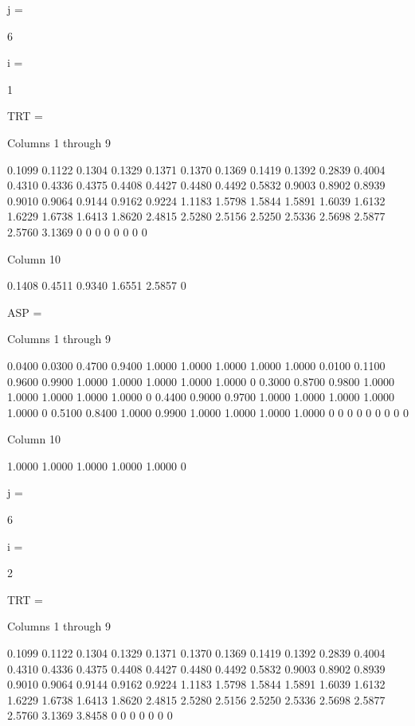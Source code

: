 j =

     6


i =

     1


TRT =

  Columns 1 through 9

    0.1099    0.1122    0.1304    0.1329    0.1371    0.1370    0.1369    0.1419    0.1392
    0.2839    0.4004    0.4310    0.4336    0.4375    0.4408    0.4427    0.4480    0.4492
    0.5832    0.9003    0.8902    0.8939    0.9010    0.9064    0.9144    0.9162    0.9224
    1.1183    1.5798    1.5844    1.5891    1.6039    1.6132    1.6229    1.6738    1.6413
    1.8620    2.4815    2.5280    2.5156    2.5250    2.5336    2.5698    2.5877    2.5760
    3.1369         0         0         0         0         0         0         0         0

  Column 10

    0.1408
    0.4511
    0.9340
    1.6551
    2.5857
         0


ASP =

  Columns 1 through 9

    0.0400    0.0300    0.4700    0.9400    1.0000    1.0000    1.0000    1.0000    1.0000
    0.0100    0.1100    0.9600    0.9900    1.0000    1.0000    1.0000    1.0000    1.0000
         0    0.3000    0.8700    0.9800    1.0000    1.0000    1.0000    1.0000    1.0000
         0    0.4400    0.9000    0.9700    1.0000    1.0000    1.0000    1.0000    1.0000
         0    0.5100    0.8400    1.0000    0.9900    1.0000    1.0000    1.0000    1.0000
         0         0         0         0         0         0         0         0         0

  Column 10

    1.0000
    1.0000
    1.0000
    1.0000
    1.0000
         0


j =

     6


i =

     2


TRT =

  Columns 1 through 9

    0.1099    0.1122    0.1304    0.1329    0.1371    0.1370    0.1369    0.1419    0.1392
    0.2839    0.4004    0.4310    0.4336    0.4375    0.4408    0.4427    0.4480    0.4492
    0.5832    0.9003    0.8902    0.8939    0.9010    0.9064    0.9144    0.9162    0.9224
    1.1183    1.5798    1.5844    1.5891    1.6039    1.6132    1.6229    1.6738    1.6413
    1.8620    2.4815    2.5280    2.5156    2.5250    2.5336    2.5698    2.5877    2.5760
    3.1369    3.8458         0         0         0         0         0         0         0

